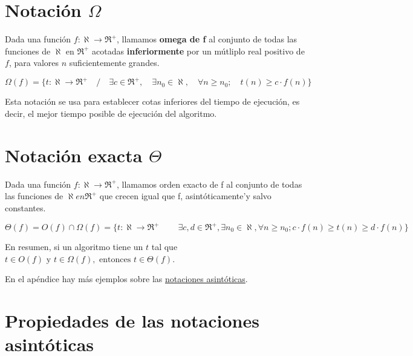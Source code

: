 \documentclass[10pt,a4paper,spanish]{report}
\theoremstyle{definition}
\theoremstyle{remark}
\begin{document}
    \section{\textcolor{YellowOrange}Notación $\Omega$}

    Dada una función $f: \aleph \rightarrow \Re^+$, llamamos \textbf{\textcolor{YellowOrange}{omega de f}} al conjunto de todas las funciones de $\aleph$ en $\Re^+$ acotadas \textbf{\textcolor{YellowOrange}{inferiormente}} por un mútliplo real positivo de $f$, para valores $n$ suficientemente grandes.

    \begin{displaymath}
        \Omega(f) = \{t:\aleph \rightarrow \Re^+ \quad / \quad \exists c \in \Re^+, \quad \exists n_0 \in \aleph, \quad \forall n \ge n_0;\quad t(n) \ge c \cdot f(n) \}
    \end{displaymath}

    Esta notación se usa para establecer cotas inferiores del tiempo de ejecución, es decir, el mejor tiempo posible de ejecución del algoritmo.

    \section{\textcolor{YellowOrange}Notación exacta $\Theta$}

    Dada una función $f: \aleph \rightarrow \Re^+$, llamamos orden exacto de f al conjunto de todas las funciones de $\aleph en \Re^+$ que crecen igual que f, asintóticamente'y salvo constantes.

    \begin{displaymath}
        \Theta(f) = O(f) \cap \Omega(f) = \{ t:\aleph \rightarrow \Re^+ \quad \ \quad \exists c, d \in \Re^+, \exists n_0 \in \aleph, \forall n \ge n_0; c \cdot f(n) \ge t(n) \ge d \cdot f(n) \}
    \end{displaymath} 

    En resumen, si un algoritmo tiene un $t$ tal que $t \in O(f) \text{ y } t \in \Omega(f), \text{ entonces } t \in \Theta(f)$.


    En el apéndice hay más ejemplos sobre las \hyperref[ejem_not]{notaciones asintóticas}.

    \section{\textcolor{YellowOrange}Propiedades de las notaciones asintóticas}
\end{document}
